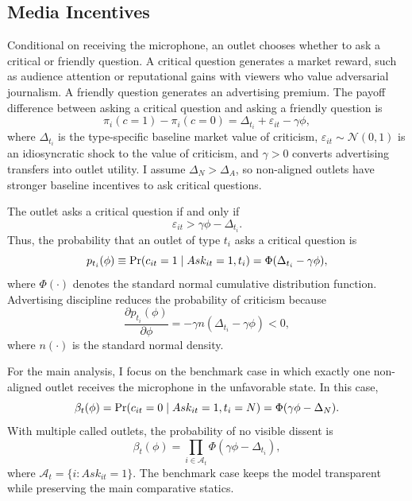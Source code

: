 \subsection{Media Incentives}

Conditional on receiving the microphone, an outlet chooses whether to ask a critical or friendly question. A critical question generates a market reward, such as audience attention or reputational gains with viewers who value adversarial journalism. A friendly question generates an advertising premium. The payoff difference between asking a critical question and asking a friendly question is
\begin{equation}
    \pi_i(c=1)-\pi_i(c=0)=\Delta_{t_i}+\varepsilon_{it}-\gamma\phi,
\end{equation}
where $\Delta_{t_i}$ is the type-specific baseline market value of criticism, $\varepsilon_{it} \sim \mathcal{N}(0,1)$ is an idiosyncratic shock to the value of criticism, and $\gamma>0$ converts advertising transfers into outlet utility. I assume $\Delta_N>\Delta_A$, so non-aligned outlets have stronger baseline incentives to ask critical questions.

The outlet asks a critical question if and only if
\begin{equation}
    \varepsilon_{it}>\gamma\phi-\Delta_{t_i}.
\end{equation}
Thus, the probability that an outlet of type $t_i$ asks a critical question is
\begin{equation}
    p_{t_i}(\phi) \equiv \Pr(c_{it}=1 \mid Ask_{it}=1,t_i)=\Phi(\Delta_{t_i}-\gamma\phi),
\end{equation}
where $\Phi(\cdot)$ denotes the standard normal cumulative distribution function. Advertising discipline reduces the probability of criticism because
\begin{equation}
    \frac{\partial p_{t_i}(\phi)}{\partial \phi}=-\gamma n(\Delta_{t_i}-\gamma\phi)<0,
\end{equation}
where $n(\cdot)$ is the standard normal density.

For the main analysis, I focus on the benchmark case in which exactly one non-aligned outlet receives the microphone in the unfavorable state. In this case,
\begin{equation}
    \beta_t(\phi)=\Pr(c_{it}=0 \mid Ask_{it}=1,t_i=N)=\Phi(\gamma\phi-\Delta_N).
\end{equation}
With multiple called outlets, the probability of no visible dissent is
\begin{equation}
    \beta_t(\phi)=\prod_{i \in \mathcal{A}_t}\Phi(\gamma\phi-\Delta_{t_i}),
\end{equation}
where $\mathcal{A}_t=\{i:Ask_{it}=1\}$. The benchmark case keeps the model transparent while preserving the main comparative statics.

